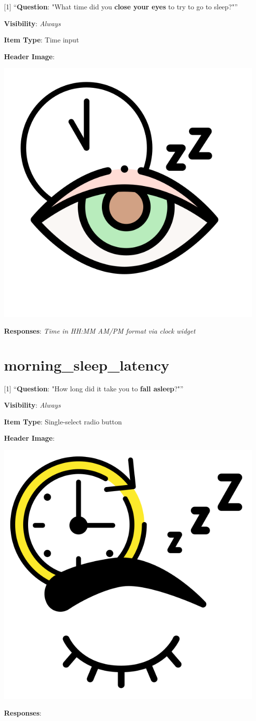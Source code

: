 \documentclass[]{book}
\begin{document}
{[}1{]} ``\textbf{Question}: "What time did you \textbf{close your eyes} to try to go to sleep?"''

\textbf{Visibility}: \emph{Always}

\textbf{Item Type}: Time input

\textbf{Header Image}:

\begin{flushleft}\includegraphics[width=0.33\linewidth]{downloadFigs4latex_NIMH_Applet_Codebook/morning_close_eyes_headerImg} \end{flushleft}

\textbf{Responses}: \emph{Time in HH:MM AM/PM format via clock widget}

\hypertarget{morning_sleep_latency}{%
\section{morning\_sleep\_latency}\label{morning_sleep_latency}}

{[}1{]} ``\textbf{Question}: "How long did it take you to \textbf{fall asleep}?"''

\textbf{Visibility}: \emph{Always}

\textbf{Item Type}: Single-select radio button

\textbf{Header Image}:

\begin{flushleft}\includegraphics[width=0.33\linewidth]{downloadFigs4latex_NIMH_Applet_Codebook/morning_sleep_latency_headerImg} \end{flushleft}

\textbf{Responses}:
\end{document}
